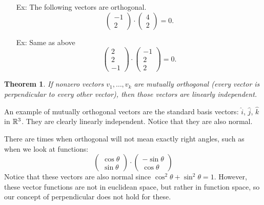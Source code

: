 \documentclass[reqno]{amsart}
\newtheorem{thm}{Theorem}
\theoremstyle{definition}
\begin{document}
\begin{itemize}

\item[Ex:  ]  The following vectors are orthogonal.
%
\begin{equation*}
\begin{pmatrix}
-1\\
2
\end{pmatrix}\cdot \begin{pmatrix}
4\\
2
\end{pmatrix} = 0.
\end{equation*}

\item[Ex:  ]  Same as above
%
\begin{equation*}
\begin{pmatrix}
2\\
2\\
-1
\end{pmatrix}\cdot \begin{pmatrix}
-1\\
2\\
2
\end{pmatrix} = 0.
\end{equation*}

\end{itemize}

\begin{thm}
If nonzero vectors $v_1,\ldots, v_k$ are mutually orthogonal (every vector is perpendicular to every
other vector), then those vectors are linearly independent.
\end{thm}

An example of mutually orthogonal vectors are the standard basis vectors: $\hat{i}$, $\hat{j}$, $\hat{k}$ in $\mathbb{R}^3$.  They are clearly linearly independent.  Notice that they are also normal.

There are times when orthogonal will not mean exactly right angles, such as when we look at functions:
%
\begin{equation*}
\begin{pmatrix}
\cos\theta\\
\sin\theta
\end{pmatrix}\cdot \begin{pmatrix}
-\sin\theta\\
\cos\theta
\end{pmatrix}
\end{equation*}
%
Notice that these vectors are also normal since $\cos^2\theta + \sin^2\theta = 1$.  However, these vector functions are not in euclidean space, but rather in function space, so our concept of perpendicular does not hold for these.
\end{document}
